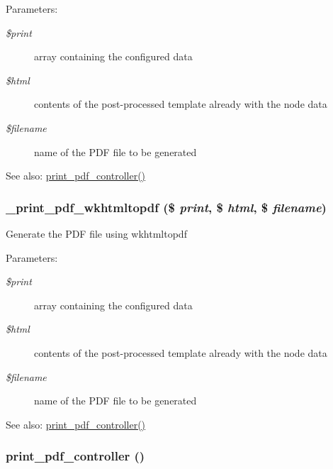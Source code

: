 \begin{Desc}
\item[Parameters:]
\begin{description}
\item[{\em \$print}]array containing the configured data \item[{\em \$html}]contents of the post-processed template already with the node data \item[{\em \$filename}]name of the PDF file to be generated \end{description}
\end{Desc}
\begin{Desc}
\item[See also:]\hyperlink{print__pdf_8pages_8inc_d2eb4e782095c48cf019319afa8fab06}{print\_\-pdf\_\-controller()} \end{Desc}
\hypertarget{print__pdf_8pages_8inc_b3c93d353c4f9989ff07bcb329681074}{
\subsubsection[{\_\-print\_\-pdf\_\-wkhtmltopdf}]{\setlength{\rightskip}{0pt plus 5cm}\_\-print\_\-pdf\_\-wkhtmltopdf (\$ {\em print}, \/  \$ {\em html}, \/  \$ {\em filename})}}
\label{print__pdf_8pages_8inc_b3c93d353c4f9989ff07bcb329681074}


Generate the PDF file using wkhtmltopdf

\begin{Desc}
\item[Parameters:]
\begin{description}
\item[{\em \$print}]array containing the configured data \item[{\em \$html}]contents of the post-processed template already with the node data \item[{\em \$filename}]name of the PDF file to be generated \end{description}
\end{Desc}
\begin{Desc}
\item[See also:]\hyperlink{print__pdf_8pages_8inc_d2eb4e782095c48cf019319afa8fab06}{print\_\-pdf\_\-controller()} \end{Desc}
\hypertarget{print__pdf_8pages_8inc_d2eb4e782095c48cf019319afa8fab06}{
\subsubsection[{print\_\-pdf\_\-controller}]{\setlength{\rightskip}{0pt plus 5cm}print\_\-pdf\_\-controller ()}}
\label{print__pdf_8pages_8inc_d2eb4e782095c48cf019319afa8fab06}


